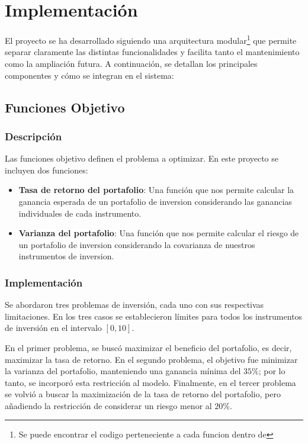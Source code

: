 \chapter{Implementaci\'on}

El proyecto se ha desarrollado siguiendo una arquitectura modular\footnote{Se puede encontrar el codigo perteneciente a cada funcion dentro de} que permite separar claramente las distintas funcionalidades y facilita tanto el mantenimiento como la ampliaci\'on futura. A continuaci\'on, se detallan los principales componentes y c\'omo se integran en el sistema:

\section{Funciones Objetivo}

\subsection{Descripci\'on}
Las funciones objetivo definen el problema a optimizar. En este proyecto se incluyen dos funciones:
\begin{itemize}
    \item \textbf{Tasa de retorno del portafolio}: Una funci\'on que nos permite calcular la ganancia esperada de un portafolio de inversion considerando las ganancias individuales de cada instrumento.
    \item \textbf{Varianza del portafolio}: Una funci\'on que nos permite calcular el riesgo de un portafolio de inversion considerando la covarianza de nuestros instrumentos de inversion.
\end{itemize}

\subsection{Implementaci\'on}
Se abordaron tres problemas de inversión, cada uno con sus respectivas limitaciones. En los tres casos se establecieron límites para todos los instrumentos de inversión en el intervalo \([0, 10]\). 

En el primer problema, se buscó maximizar el beneficio del portafolio, es decir, maximizar la tasa de retorno. En el segundo problema, el objetivo fue minimizar la varianza del portafolio, manteniendo una ganancia mínima del \(35\%\); por lo tanto, se incorporó esta restricción al modelo. Finalmente, en el tercer problema se volvió a buscar la maximización de la tasa de retorno del portafolio, pero añadiendo la restricción de considerar un riesgo menor al \(20\%\).

